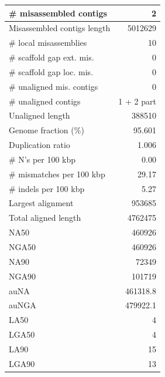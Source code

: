 \documentclass[12pt,a4paper]{article}
\begin{document}
\begin{table}[ht]
\begin{center}
\begin{tabular}{|l*{1}{|r}|}
\# misassembled contigs & 2 \\ \hline
Misassembled contigs length & 5012629 \\ \hline
\# local misassemblies & 10 \\ \hline
\# scaffold gap ext. mis. & 0 \\ \hline
\# scaffold gap loc. mis. & 0 \\ \hline
\# unaligned mis. contigs & 0 \\ \hline
\# unaligned contigs & 1 + 2 part \\ \hline
Unaligned length & 388510 \\ \hline
Genome fraction (\%) & 95.601 \\ \hline
Duplication ratio & 1.006 \\ \hline
\# N's per 100 kbp & 0.00 \\ \hline
\# mismatches per 100 kbp & 29.17 \\ \hline
\# indels per 100 kbp & 5.27 \\ \hline
Largest alignment & 953685 \\ \hline
Total aligned length & 4762475 \\ \hline
NA50 & 460926 \\ \hline
NGA50 & 460926 \\ \hline
NA90 & 72349 \\ \hline
NGA90 & 101719 \\ \hline
auNA & 461318.8 \\ \hline
auNGA & 479922.1 \\ \hline
LA50 & 4 \\ \hline
LGA50 & 4 \\ \hline
LA90 & 15 \\ \hline
LGA90 & 13 \\ \hline
\end{tabular}
\end{center}
\end{table}
\end{document}
